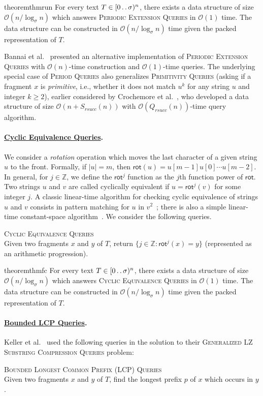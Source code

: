 \documentclass[a4paper]{article}
\theoremstyle{definition}
\theoremstyle{remark}
\newcommand{\PQ}{\textsc{Period Queries}\xspace}
\newcommand{\PEQ}{\textsc{Periodic Extension Queries}\xspace}
\newcommand{\FC}{\textsc{Cyclic Equivalence Queries}\xspace}
\newcommand{\BLCPFull}{\textsc{Bounded Longest Common Prefix (LCP) Queries}\xspace}
\newcommand{\GSC}{\textsc{Generalized LZ Substring Compression Queries}\xspace}
\newcommand{\integ}{\mathbb{Z}}
\newcommand{\dd}{\mathinner{\ldotp\ldotp}}
\newcommand{\Rot}{\mathsf{rot}}
\newcommand{\Oh}{\mathcal{O}}
\newcommand{\rsucc}{\mathit{rsucc}}
\newenvironment{dsproblem}[1]
{\begin{center}\begin{lrbox}{\mybox}\begin{minipage}{0.96\columnwidth}{\textsc{#1}}\\}
{\end{minipage}\end{lrbox}\fbox{\usebox{\mybox}}\end{center}}
\newcommand{\defdsproblem}[2]{
  \begin{dsproblem}{#1}
#2
  \end{dsproblem}
  }
\begin{document}
\begin{restatable}{theorem}{thmrun}\label{thm:run}
  For every text $T\in [0\dd\sigma)^n$, there exists a data structure of size $\Oh(n/\log_\sigma n)$ which answers \PEQ in $\Oh(1)$ time. The data structure can be constructed in $\Oh(n/\log_\sigma n)$ time given the packed representation of $T$.
\end{restatable}

Bannai et al.~\cite{DBLP:journals/siamcomp/BannaiIINTT17} presented an alternative implementation of \PEQ with $\Oh(n)$-time construction and $\Oh(1)$-time queries.
The underlying special case of \PQ also generalizes \textsc{Primitivity Queries}
(asking if a fragment $x$ is \emph{primitive}, i.e., whether it does not match $u^k$ for any string $u$ and integer $k\ge 2$),
earlier considered by Crochemore et al.~\cite{DBLP:journals/tcs/CrochemoreIKRRW14},
who developed a data structure of size $\Oh(n+S_\rsucc(n))$ with  $\Oh(Q_{\rsucc}(n))$-time query algorithm.

\paragraph{\underline{Cyclic Equivalence Queries}.}
We consider a \emph{rotation} operation which moves the last character of a given string $u$ to the front.
Formally, if $|u|=m$, then $\Rot(u)=u[m-1] u[0] \cdots u[m-2]$.
In general, for $j\in \integ$, we define the $\Rot^j$ function as the $j$th function power of $\Rot$.
Two strings $u$ and $v$ are called cyclically equivalent if $u=\Rot^j(v)$ for some integer $j$.
A classic linear-time algorithm for checking cyclic equivalence of strings $u$ and $v$ consists in pattern matching for $u$ in $v^2$~\cite{DBLP:journals/ipl/Manacher76}; there is also a simple linear-time constant-space algorithm~\cite{Jewels}.
We consider the following queries.

\defdsproblem{\FC}{
Given two fragments $x$ and $y$ of $T$, return $\{j\in \integ : \Rot^j(x)=y\}$ (represented as an arithmetic progression).
}

\begin{restatable}{theorem}{thmfc}\label{thm:app-fc}
  For every text $T\in [0\dd \sigma)^n$, there exists a data structure of size $\Oh(n/\log_\sigma n)$ which answers \FC in $\Oh(1)$ time. The data structure can be constructed in $\Oh(n/\log_\sigma n)$ time given the packed representation of $T$.
\end{restatable}

\paragraph{\underline{Bounded LCP Queries}.}
Keller et al.~\cite{DBLP:journals/tcs/KellerKFL14} used the following queries in the solution to their \GSC problem:
\defdsproblem{\BLCPFull}{Given two fragments $x$ and $y$ of $T$, find the longest prefix $p$ of $x$ which  occurs in $y$.}
\end{document}
